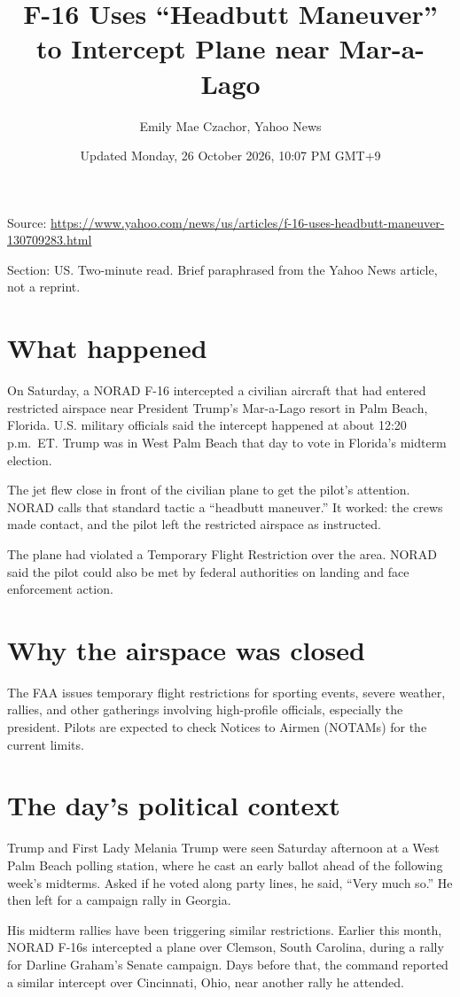 \documentclass[11pt]{article}
\title{F-16 Uses ``Headbutt Maneuver'' to Intercept Plane near Mar-a-Lago}
\author{Emily Mae Czachor, Yahoo News}
\date{Updated Monday, 26 October 2026, 10:07 PM GMT+9}
\begin{document}
\maketitle

\noindent Source: \url{https://www.yahoo.com/news/us/articles/f-16-uses-headbutt-maneuver-130709283.html}

\noindent Section: US. Two-minute read. Brief paraphrased from the Yahoo News article, not a reprint.

\section*{What happened}

On Saturday, a NORAD F-16 intercepted a civilian aircraft that had entered restricted airspace near President Trump's Mar-a-Lago resort in Palm Beach, Florida. U.S. military officials said the intercept happened at about 12:20 p.m.\ ET. Trump was in West Palm Beach that day to vote in Florida's midterm election.

The jet flew close in front of the civilian plane to get the pilot's attention. NORAD calls that standard tactic a ``headbutt maneuver.'' It worked: the crews made contact, and the pilot left the restricted airspace as instructed.

The plane had violated a Temporary Flight Restriction over the area. NORAD said the pilot could also be met by federal authorities on landing and face enforcement action.

\section*{Why the airspace was closed}

The FAA issues temporary flight restrictions for sporting events, severe weather, rallies, and other gatherings involving high-profile officials, especially the president. Pilots are expected to check Notices to Airmen (NOTAMs) for the current limits.

\section*{The day's political context}

Trump and First Lady Melania Trump were seen Saturday afternoon at a West Palm Beach polling station, where he cast an early ballot ahead of the following week's midterms. Asked if he voted along party lines, he said, ``Very much so.'' He then left for a campaign rally in Georgia.

His midterm rallies have been triggering similar restrictions. Earlier this month, NORAD F-16s intercepted a plane over Clemson, South Carolina, during a rally for Darline Graham's Senate campaign. Days before that, the command reported a similar intercept over Cincinnati, Ohio, near another rally he attended.
\end{document}
